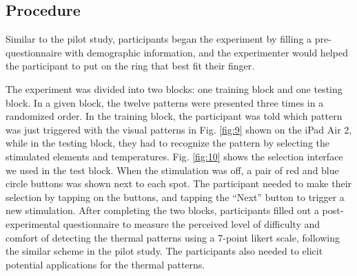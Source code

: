 \documentclass[preprint,12pt]{elsarticle}
\begin{document}

\subsection{Procedure}
Similar to the pilot study, participants began the experiment by filling a pre-questionnaire with demographic information, and the experimenter would helped the participant to put on the ring that best fit their finger.

The experiment was divided into two blocks: one training block and one testing block. In a given block, the twelve patterns were presented three times in a randomized order. In the training block, the participant was told which pattern was just triggered with the visual patterns in Fig. \ref{fig:9} shown on the iPad Air 2, while in the testing block, they had to recognize the pattern by selecting the stimulated elements and temperatures. Fig. \ref{fig:10} shows the selection interface we used in the test block. When the stimulation was off, a pair of red and blue circle buttons was shown next to each spot. The participant needed to make their selection by tapping on the buttons, and tapping the ``Next'' button to trigger a new stimulation. After completing the two blocks, participants filled out a post-experimental questionnaire to measure the perceived level of difficulty and comfort of detecting the thermal patterns using a 7-point likert scale, following the similar scheme in the pilot study. The participants also needed to elicit potential applications for the thermal patterns.
\end{document}
